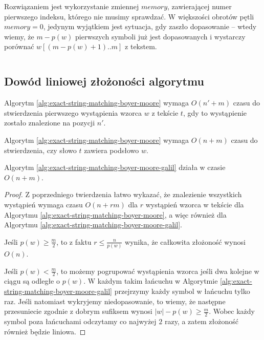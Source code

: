 Rozwiązaniem jest wykorzystanie zmiennej $memory$, zawierającej numer pierwszego indeksu, którego nie musimy sprawdzać.
W większości obrotów pętli $memory = 0$, jedynym wyjątkiem jest sytuacja, gdy zaszło dopasowanie -- wtedy wiemy, że $m - p(w)$ pierwszych symboli już jest dopasowanych i wystarczy porównać $w[(m - p(w) + 1)..m]$ z tekstem.

\begin{code}
\inputminted{python}{code/exact-string-matching/boyer-moore-galil.py}
\label{alg:exact-string-matching-boyer-moore-galil}
\end{code}

\subsection{Dowód liniowej złożoności algorytmu}


\begin{theorem}{}{}
  Algorytm \ref{alg:exact-string-matching-boyer-moore} wymaga $O(n' + m)$ czasu do stwierdzenia pierwszego wystąpienia wzorca $w$ z tekście $t$, gdy to wystąpienie zostało znalezione na pozycji $n'$.
\end{theorem}

\begin{corollary}{}{}
  Algorytm \ref{alg:exact-string-matching-boyer-moore} wymaga $O(n + m)$ czasu do stwierdzenia, czy słowo $t$ zawiera podsłowo $w$.
\end{corollary}

\begin{theorem}{}{}
  Algorytm \ref{alg:exact-string-matching-boyer-moore-galil} działa w czasie $O(n + m)$.
\end{theorem}

\begin{proof}
  Z poprzedniego twierdzenia łatwo wykazać, że znalezienie wszystkich wystąpień wymaga czasu $O(n + r m)$ dla $r$ wystąpień wzorca w tekście dla Algorytmu \ref{alg:exact-string-matching-boyer-moore}, a więc również dla Algorytmu \ref{alg:exact-string-matching-boyer-moore-galil}.
  
  Jeśli $p(w) \ge \frac{m}{2}$, to z faktu $r \le \frac{n}{p(w)}$ wynika, że całkowita złożoność wynosi $O(n)$.
  
  Jeśli $p(w) < \frac{m}{2}$, to możemy pogrupować wystąpienia wzorca jeśli dwa kolejne w ciągu są odległe o $p(w)$. W każdym takim łańcuchu w Algorytmie \ref{alg:exact-string-matching-boyer-moore-galil} przejrzymy każdy symbol w łańcuchu tylko raz.
  Jeśli natomiast wykryjemy niedopasowanie, to wiemy, że następne przesuniecie zgodnie z dobrym sufiksem wynosi $|w| - p(w) \ge \frac{m}{2}$. Wobec każdy symbol poza łańcuchami odczytamy co najwyżej $2$ razy, a zatem złożoność również będzie liniowa.
\end{proof}


